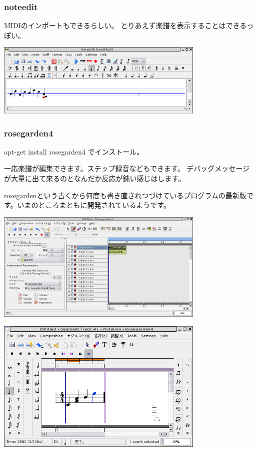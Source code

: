 \documentclass[mingoth,a4paper]{jsarticle}
\begin{document}
\subsubsection{noteedit}

MIDIのインポートもできるらしい。
とりあえず楽譜を表示することはできるっぽい。

\includegraphics[width=10cm]{image200602/noteedit.png}

\subsubsection{rosegarden4}

apt-get install rosegarden4 でインストール。

一応楽譜が編集できます。ステップ録音などもできます。
デバッグメッセージが大量に出て来るのとなんだか反応が鈍い感じはします。

rosegardenという古くから何度も書き直されつづけているプログラムの最新版で
す。いまのところまともに開発されているようです。

\includegraphics[width=10cm]{image200602/rosegarden4-1.png}

\includegraphics[width=10cm]{image200602/rosegarden4-2.png}
\end{document}

